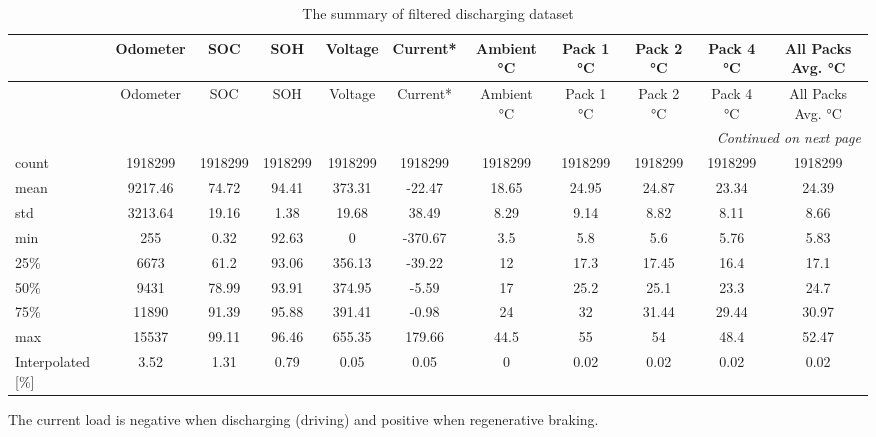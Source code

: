 \begin{table} %
    \centering
    \begin{longtable}{lcccccccccc}
        \caption{The summary of filtered discharging dataset} \label{tab:the_dataset_overview} \\
        \toprule
        & Odometer & SOC & SOH & Voltage & Current* & Ambient °C 
        & Pack 1 °C & Pack 2 °C & Pack 4 °C & All Packs Avg. °C \\ 
        \midrule
        \endfirsthead
        \toprule
        & Odometer & SOC & SOH & Voltage & Current* & Ambient °C 
        & Pack 1 °C & Pack 2 °C & Pack 4 °C & All Packs Avg. °C \\ 
        \midrule
        \endhead
        \midrule
        \multicolumn{11}{r}{\textit{Continued on next page}} \\
        \midrule
        \endfoot
        \bottomrule
        \endlastfoot
        count & 1918299 & 1918299 & 1918299 & 1918299 & 1918299 & 1918299 
              & 1918299 & 1918299 & 1918299 & 1918299 \\ 
        mean & 9217.46 & 74.72 & 94.41 & 373.31 & -22.47 & 18.65 
             & 24.95 & 24.87 & 23.34 & 24.39 \\ 
        std & 3213.64 & 19.16 & 1.38 & 19.68 & 38.49 & 8.29 
            & 9.14 & 8.82 & 8.11 & 8.66 \\ 
        min & 255 & 0.32 & 92.63 & 0 & -370.67 & 3.5 
            & 5.8 & 5.6 & 5.76 & 5.83 \\ 
        25\% & 6673 & 61.2 & 93.06 & 356.13 & -39.22 & 12 
             & 17.3 & 17.45 & 16.4 & 17.1 \\ 
        50\% & 9431 & 78.99 & 93.91 & 374.95 & -5.59 & 17 
             & 25.2 & 25.1 & 23.3 & 24.7 \\ 
        75\% & 11890 & 91.39 & 95.88 & 391.41 & -0.98 & 24 
             & 32 & 31.44 & 29.44 & 30.97 \\ 
        max & 15537 & 99.11 & 96.46 & 655.35 & 179.66 & 44.5 
            & 55 & 54 & 48.4 & 52.47 \\ 
        Interpolated [\%] & 3.52 & 1.31 & 0.79 & 0.05 & 0.05 & 0 
                          & 0.02 & 0.02 & 0.02 & 0.02 \\ 
    \end{longtable}
    
    \begin{threeparttable}
        \begin{tablenotes}
            \item * The current load is negative when discharging (driving) and positive when regenerative braking.
        \end{tablenotes}
    \end{threeparttable}
    \end{table}



